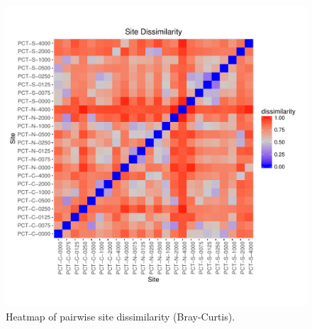 \documentclass[11pt,letterpaper]{article} %
\begin{document}
\begin{figure}[h!] %
  \centering
    \includegraphics[width=1\textwidth]{../../Figures/heatmap_sites.pdf}
    \caption{Heatmap of pairwise site dissimilarity (Bray-Curtis).}
  \label{heatmap} %
\end{figure}
\end{document}
